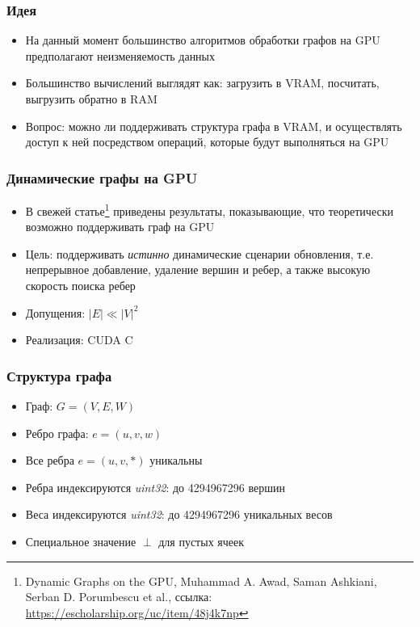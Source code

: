 \documentclass[xcolor=table,english]{beamer}
\begin{document}
\begin{frame}[fragile] \frametitle{Идея}
    \begin{itemize}
        \item На данный момент большинство алгоритмов обработки графов на GPU 
              предполагают неизменяемость данных
        \item Большинство вычислений выглядят как: загрузить в VRAM, посчитать, 
              выгрузить обратно в RAM
        \item Вопрос: можно ли поддерживать структура графа в VRAM, и осуществлять доступ 
              к ней посредством операций, которые будут выполняться на GPU
    \end{itemize}
\end{frame}

\begin{frame}[fragile] \frametitle{Динамические графы на GPU} 
    \begin{itemize}
        \item В свежей статье\footnote{Dynamic Graphs on the GPU, Muhammad A. Awad, 
              Saman Ashkiani, Serban D. Porumbescu et al., ссылка: 
              \href{https://escholarship.org/uc/item/48j4k7np}{https://escholarship.org/uc/item/48j4k7np}} 
              приведены результаты, показывающие, что теоретически возможно поддерживать граф на GPU
        \item Цель: поддерживать \textit{истинно} динамические сценарии обновления, т.е. непрерывное             добавление, удаление вершин и ребер, а также высокую скорость поиска ребер
        \item Допущения: $|E| \ll |V|^2$
        \item Реализация: CUDA C
    \end{itemize}
\end{frame}

\begin{frame}[fragile] \frametitle{Структура графа}
    \begin{itemize}
        \item Граф: $G = (V,E,W)$
        \item Ребро графа: $e = (u,v,w)$
        \item Все ребра $e = (u,v,*)$ уникальны
        \item Ребра индексируются \textit{uint32}: до 4294967296 вершин 
        \item Веса индексируются \textit{uint32}: до 4294967296 уникальных весов
        \item Специальное значение $\perp$ для пустых ячеек
    \end{itemize}
\end{frame}
\end{document}
